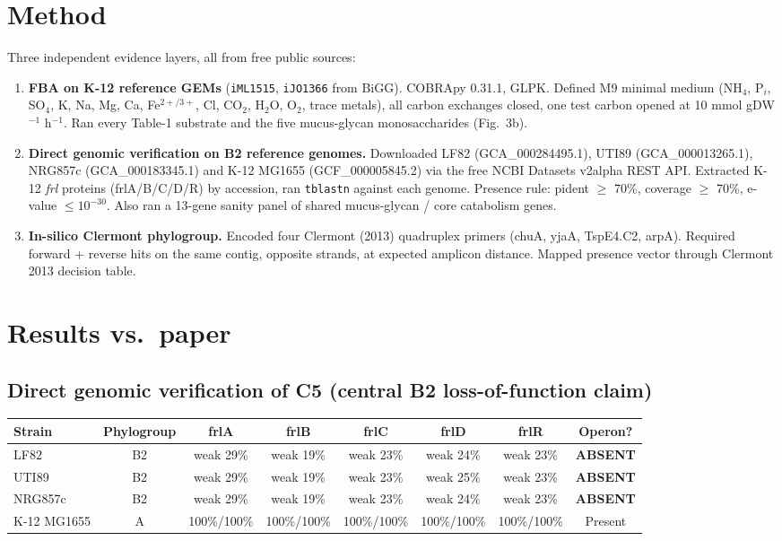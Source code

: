 \documentclass[11pt]{article}
\begin{document}
\section{Method}
Three independent evidence layers, all from free public sources:
\begin{enumerate}
  \item \textbf{FBA on K-12 reference GEMs} (\texttt{iML1515}, \texttt{iJO1366}
    from BiGG). COBRApy 0.31.1, GLPK. Defined M9 minimal medium
    (NH$_4$, P$_i$, SO$_4$, K, Na, Mg, Ca, Fe$^{2+/3+}$, Cl, CO$_2$,
    H$_2$O, O$_2$, trace metals), all carbon exchanges closed, one test
    carbon opened at 10 mmol gDW$^{-1}$ h$^{-1}$. Ran every Table-1
    substrate and the five mucus-glycan monosaccharides (Fig.~3b).
  \item \textbf{Direct genomic verification on B2 reference genomes.}
    Downloaded LF82 (GCA\_000284495.1), UTI89 (GCA\_000013265.1),
    NRG857c (GCA\_000183345.1) and K-12 MG1655 (GCF\_000005845.2) via
    the free NCBI Datasets v2alpha REST API. Extracted K-12 \emph{frl}
    proteins (frlA/B/C/D/R) by accession, ran \texttt{tblastn} against
    each genome. Presence rule: pident $\geq$ 70\%, coverage $\geq$
    70\%, e-value $\leq 10^{-30}$. Also ran a 13-gene sanity panel of
    shared mucus-glycan / core catabolism genes.
  \item \textbf{In-silico Clermont phylogroup.} Encoded four Clermont
    (2013) quadruplex primers (chuA, yjaA, TspE4.C2, arpA). Required
    forward + reverse hits on the same contig, opposite strands, at
    expected amplicon distance. Mapped presence vector through Clermont
    2013 decision table.
\end{enumerate}

\section{Results vs.\ paper}

\subsection{Direct genomic verification of C5 (central B2 loss-of-function claim)}
\begin{tabular}{lccccccc}
\toprule
Strain & Phylogroup & frlA & frlB & frlC & frlD & frlR & Operon? \\
\midrule
LF82         & B2 & weak 29\% & weak 19\% & weak 23\% & weak 24\% & weak 23\% & \textbf{ABSENT} \\
UTI89        & B2 & weak 29\% & weak 19\% & weak 23\% & weak 25\% & weak 23\% & \textbf{ABSENT} \\
NRG857c      & B2 & weak 29\% & weak 19\% & weak 23\% & weak 24\% & weak 23\% & \textbf{ABSENT} \\
K-12 MG1655  & A  & 100\%/100\% & 100\%/100\% & 100\%/100\% & 100\%/100\% & 100\%/100\% & Present \\
\bottomrule
\end{tabular}
\end{document}
